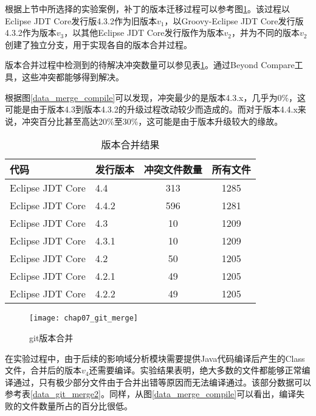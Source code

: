 根据上节中所选择的实验案例，补丁的版本迁移过程可以参考图\ref {exp_git_merge}。该过程以Eclipse JDT Core发行版4.3.2作为旧版本$v_1$，以Groovy-Eclipse JDT Core发行版4.3.2作为版本$v_3$，以其他Eclipse JDT Core发行版作为版本$v_2$，并为不同的版本$v_2$创建了独立分支，用于实现各自的版本合并过程。

版本合并过程中检测到的待解决冲突数量可以参见表\ref {data_git_merge}。通过Beyond Compare工具，这些冲突都能够得到解决。

根据图\ref {data_merge_compile}可以发现，冲突最少的是版本4.3.x，几乎为0\%，这可能是由于版本4.3到版本4.3.2的升级过程改动较少而造成的。而对于版本4.4.x来说，冲突百分比甚至高达20\%至30\%，这可能是由于版本升级较大的缘故。




\begin{table}[H]
	\caption{版本合并结果}
	\label{data_git_merge}
	\centering
	\begin{tabular}{llcc}
		\toprule[1.5pt]
		{\heiti 代码} & {\heiti 发行版本} & {\heiti 冲突文件数量} & {\heiti 所有文件}\\\midrule[1pt]
		Eclipse JDT Core & 4.4 & 313 & 1285\\
		Eclipse JDT Core & 4.4.2 & 596 & 1281\\
		Eclipse JDT Core & 4.3 & 10 & 1209\\
		Eclipse JDT Core & 4.3.1 & 10 & 1209\\
		Eclipse JDT Core & 4.2 & 50 & 1205\\
		Eclipse JDT Core & 4.2.1 & 49 & 1205\\
		Eclipse JDT Core & 4.2.2 & 49 & 1205\\
		\bottomrule[1.5pt]
	\end{tabular}
\end{table}

\begin{figure}[H]
	\centering
	\texttt{[image: chap07\_git\_merge]}
	\caption {git版本合并}
	\label {exp_git_merge}	
\end{figure}



在实验过程中，由于后续的影响域分析模块需要提供Java代码编译后产生的Class文件，合并后的版本$v_4$还需要编译。实验结果表明，绝大多数的文件都能够正常编译通过，只有极少部分文件由于合并出错等原因而无法编译通过。该部分数据可以参考表\ref {data_git_merge2}。同样，从图\ref {data_merge_compile}可以看出，编译失败的文件数量所占的百分比很低。



